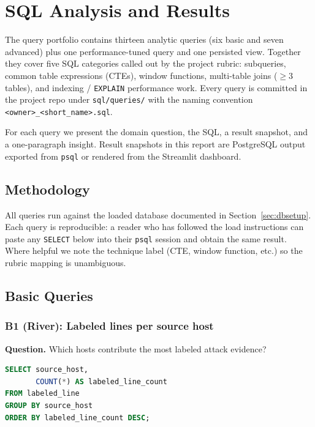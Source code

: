 \section{SQL Analysis and Results}
\label{sec:sql}

The query portfolio contains thirteen analytic queries (six basic and seven
advanced) plus one performance-tuned query and one persisted view. Together
they cover five SQL categories called out by the project rubric: subqueries,
common table expressions (CTEs), window functions, multi-table joins
($\geq 3$ tables), and indexing / \texttt{EXPLAIN} performance work. Every
query is committed in the project repo under \texttt{sql/queries/} with the
naming convention \texttt{<owner>\_<short\_name>.sql}.

For each query we present the domain question, the SQL, a result snapshot,
and a one-paragraph insight. Result snapshots in this report are
PostgreSQL output exported from \texttt{psql} or rendered from the
Streamlit dashboard.

\subsection{Methodology}
All queries run against the loaded database documented in
Section~\ref{sec:dbsetup}. Each query is reproducible: a reader who has
followed the load instructions can paste any \texttt{SELECT} below into
their \texttt{psql} session and obtain the same result. Where helpful we
note the technique label (CTE, window function, etc.) so the rubric
mapping is unambiguous.

\subsection{Basic Queries}

\subsubsection{B1 (River): Labeled lines per source host}
\textbf{Question.} Which hosts contribute the most labeled attack
evidence?

\begin{lstlisting}[language=SQL]
SELECT source_host,
       COUNT(*) AS labeled_line_count
FROM labeled_line
GROUP BY source_host
ORDER BY labeled_line_count DESC;
\end{lstlisting}

